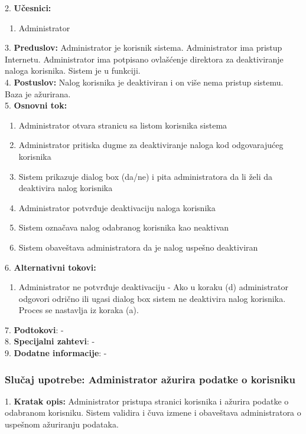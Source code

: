 \documentclass{article}
\begin{document}
2. \textbf{Učesnici:}
\begin{enumerate} [label=(\alph*)]
\item Administrator
\end{enumerate} 

3. \textbf{Preduslov:} Administrator je korisnik sistema. Administrator ima pristup Internetu. Administrator ima potpisano ovlašćenje direktora za deaktiviranje naloga korisnika. Sistem je u funkciji. \\

4. \textbf{Postuslov:} Nalog korisnika je deaktiviran i on više nema pristup sistemu. Baza je ažurirana. \\

5. \textbf{Osnovni tok:} 
\begin{enumerate} [label=(\alph*)]
\item Administrator otvara stranicu sa listom korisnika sistema
\item Administrator pritiska dugme za deaktiviranje naloga kod odgovarajućeg korisnika
\item Sistem prikazuje dialog box (da/ne) i pita administratora da li želi da deaktivira nalog korisnika
\item Administrator potvrđuje deaktivaciju naloga korisnika
\item Sistem označava nalog odabranog korisnika kao neaktivan
\item Sistem obaveštava administratora da je nalog uspešno deaktiviran
\end{enumerate}

6. \textbf{Alternativni tokovi:}
\begin{enumerate} [label=(\roman*)]
    \item Administrator ne potvrđuje deaktivaciju - Ako u koraku (d) administrator odgovori odrično ili ugasi dialog box sistem ne deaktivira nalog korisnika. Proces se nastavlja iz koraka (a).
\end{enumerate}

7. \textbf{Podtokovi}: - \\

8. \textbf{Specijalni zahtevi}: - \\

9. \textbf{Dodatne informacije}: - \\

\subsubsection{Slučaj upotrebe: Administrator ažurira podatke o korisniku}
1. \textbf{Kratak opis:} Administrator pristupa stranici korisnika i ažurira podatke o odabranom korisniku. Sistem validira i čuva izmene i obaveštava administratora o uspešnom ažuriranju podataka. \\
\end{document}
